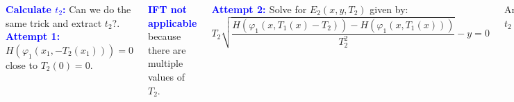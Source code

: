 \documentclass[xcolor=x11names,compress]{beamer}
\renewcommand{\(}{\begin{columns}}
\renewcommand{\)}{\end{columns}}
\newcommand{\<}[1]{\begin{column}{#1}}
\renewcommand{\>}{\end{column}}
\newcommand{\hlb}[1]{\textbf{\textcolor{blue}{#1}}}
\begin{document}
\begin{frame}
\begin{columns}[c]
\hlb{ Calculate $t_2$:}
Can we do the same trick and extract $t_2$?.\\
\vspace{1em}
\hlb{ Attempt 1: }$H(\varphi_1(x_1,-T_2(x_1)))=0$ close to $T_2(0)=0$.  \\

\vspace{1em}

\hlb{ IFT not applicable} because there are multiple values of $T_2$.  

\vspace{1em}
\hlb{ Attempt 2: } Solve for $E_2(x,y,T_2)$ given by:
\[
T_2\sqrt{\frac{H(\varphi_1(x,T_1(x)-T_2))-H(\varphi_1(x,T_1(x)))}{T_2^2}}-y=0
\]

Around $(0,0,0)$.  \\
$t_2=T_2(x_0,\sqrt(-H_{min}(x_0)))$
\\


\begin{center}
\includegraphics[width=\textwidth]{ZDM}
\end{center}

\end{columns}
\end{frame}
\end{document}
